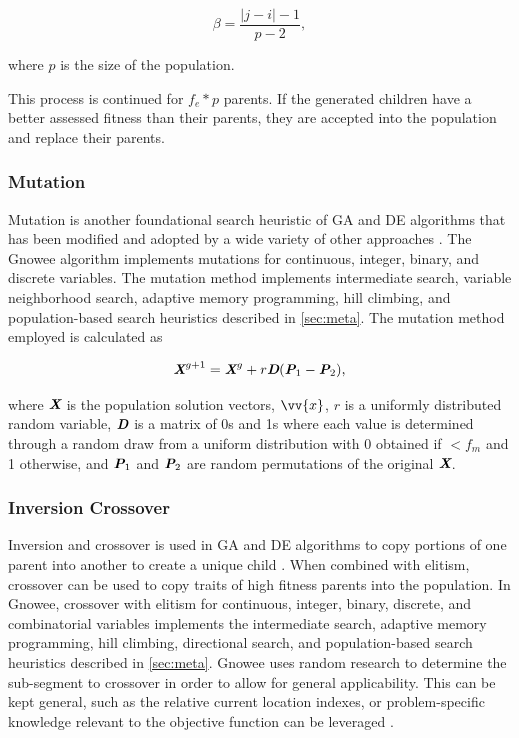 \documentclass{article}                                                                           %
\begin{document}
\begin{equation}
  \beta = \frac{|j-i|-1}{p-2},
\end{equation}

\noindent where $p$ is the size of the population.

This process is continued for $f_e * p$ parents.
If the generated children have a better assessed fitness than their parents, they are accepted into the population and replace their parents.

\subsubsection{Mutation}
Mutation is another foundational search heuristic of GA and DE algorithms that has been modified and adopted by a wide variety of other approaches \cite{Storn1997, Yang2014, Back1993}.  
The Gnowee algorithm implements mutations for continuous, integer, binary, and discrete variables.
The mutation method implements intermediate search, variable neighborhood search, adaptive memory programming, hill climbing, and population-based search heuristics described in \autoref{sec:meta}. 
The mutation method employed is calculated as 

\begin{equation}
  \textit{\textbf{X}}^{g+1}=\textit{\textbf{X}}^g+r \textit{\textbf{D}} (\textit{\textbf{P}}_1-\textit{\textbf{P}}_2),
\end{equation}

\noindent where $\textit{\textbf{X}}$ is the population solution vectors, $\vv{x}$, $r$ is a uniformly distributed random variable, $\textit{\textbf{D}}$ is a matrix of 0s and 1s where each value is determined through a random draw from a uniform distribution with 0 obtained if $<f_m$ and 1 otherwise, and $\textit{\textbf{P}}_1$ and $\textit{\textbf{P}}_2$ are random permutations of the original $\textit{\textbf{X}}$. 

\subsubsection{Inversion Crossover}
Inversion and crossover is used in GA and DE algorithms to copy portions of one parent into another to create a unique child \cite{Storn1997, Tao1998, Back1993}. 
When combined with elitism, crossover can be used to copy traits of high fitness parents into the population.   
In Gnowee, crossover with elitism for continuous, integer, binary,  discrete, and combinatorial variables implements the intermediate search, adaptive memory programming, hill climbing, directional search, and population-based search heuristics described in \autoref{sec:meta}.
Gnowee uses random research to determine the sub-segment to crossover in order to allow for general applicability.  
This can be kept general, such as the relative current location indexes, or problem-specific knowledge relevant to the objective function can be leveraged \cite{Tao1998, Zhou2014}. 
\end{document}
